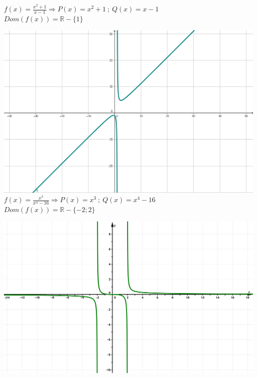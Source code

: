 \documentclass[a4paper,11pt,spanish,sans]{exam}
\begin{document}
\begin{minipage}{0.45\textwidth}
$f(x)=\frac{x^2+1}{x-1} \Rightarrow P(x)=x^2+1 \: ; \: Q(x)=x-1$\\
$Dom(f(x))=\mathbb{R} - \lbrace 1\rbrace$

\includegraphics[width= \linewidth]{ejemplo3guia.png}\\

$f(x)=\frac{x^3}{x^4-16} \Rightarrow P(x)=x^3 \: ; \: Q(x)=x^4-16$\\
$Dom(f(x))=\mathbb{R} - \lbrace -2; 2\rbrace$

\includegraphics[width= \linewidth]{ejemplorac5.png}



\end{minipage}
\end{document}

